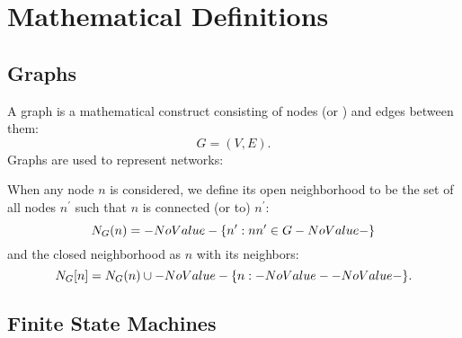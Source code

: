 \section{Mathematical Definitions}
\label{sec:math-defin}

\subsection{Graphs}
\label{sec:math-defin:graphs}

A \gls{graph} is a mathematical construct
  consisting of \glspl{node} (or ) and \glspl{edge} between them:
  \[ G = (V, E). \]
Graphs are used to represent networks:

When any node $n$ is considered, we define its \gls{open neighborhood} to be
  the set of all nodes $n^\prime$ such that $n$ is connected (or  to) $n^\prime$:
  \[ \OpenNeighborhood{n}[G] = \Set{n^\prime}[nn^\prime \in G] \]
  and the \gls{closed neighborhood} as $n$ with its neighbors:
  \[ \ClosedNeighborhood{n}[G] = \OpenNeighborhood{n}[G] \cup \Set{n}. \]

\subsection{Finite State Machines}
\label{sec:math-defin:fsm}

